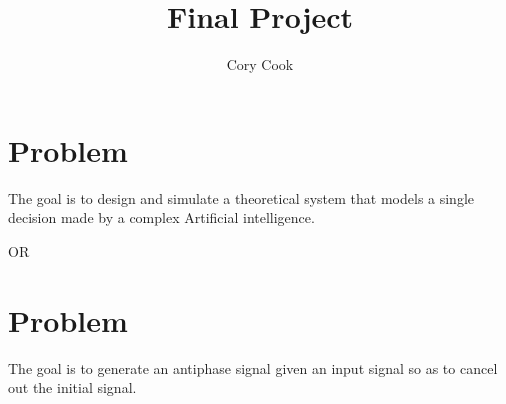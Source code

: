 \documentclass{article}
\title{Final Project}
\author{Cory Cook}
\begin{document}
\maketitle
\section{Problem}
The goal is to design and simulate a theoretical system that models a single decision made by a complex Artificial intelligence. 

OR
\section{Problem}
The goal is to generate an antiphase signal given an input signal so as to cancel out the initial signal.
\end{document}
